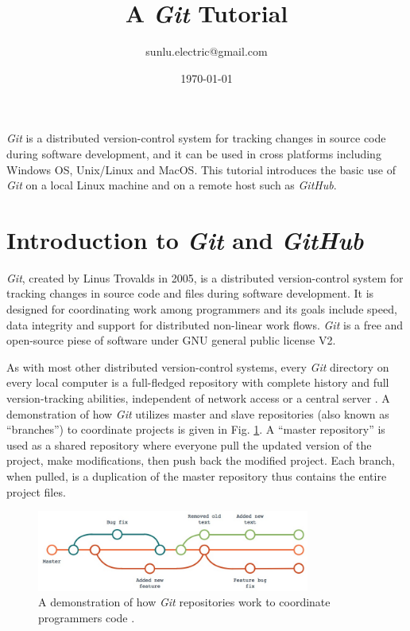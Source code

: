 \documentclass[a4paper]{article}
\title{A \textit{Git} Tutorial}
\author{sunlu.electric@gmail.com}
\date{\today}
\begin{document}
\maketitle

\textit{Git} is a distributed version-control system for tracking changes in source code during software development, and it can be used in cross platforms including Windows OS, Unix/Linux and MacOS. This tutorial introduces the basic use of \textit{Git} on a local Linux machine and on a remote host such as \textit{GitHub}.

\tableofcontents

\section{Introduction to \textit{Git} and \textit{GitHub}}

\textit{Git}, created by Linus Trovalds in 2005, is a distributed version-control system for tracking changes in source code and files during software development. It is designed for coordinating work among programmers and its goals include speed, data integrity and support for distributed non-linear work flows. \textit{Git} is a free and open-source piese of software under GNU general public license V2.

As with most other distributed version-control systems, every \textit{Git} directory on every local computer is a full-fledged repository with complete history and full version-tracking abilities, independent of network access or a central server \cite{wikipediaGit}. A demonstration of how \textit{Git} utilizes master and slave repositories (also known as ``branches'') to coordinate projects is given in Fig. \ref{fig:Gitrepositorydemo}. A ``master repository'' is used as a shared repository where everyone pull the updated version of the project, make modifications, then push back the modified project. Each branch, when pulled, is a duplication of the master repository thus contains the entire project files.

\begin{figure}[htbp]
    \centering
    \includegraphics[width=0.8\textwidth]{figGitrepositorydemo.jpg}
    \caption{A demonstration of how \textit{Git} repositories work to coordinate programmers code \cite{blogGitVersionControl}. }
    \label{fig:Gitrepositorydemo}
\end{figure}
\end{document}
